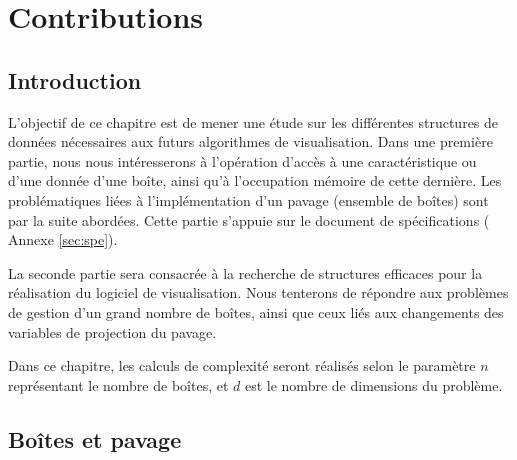 \chapter{Contributions}\label{chap:con}


\section{Introduction}%

L'objectif de ce chapitre est de mener une étude sur les différentes structures de données nécessaires aux futurs algorithmes de visualisation. Dans une première partie, nous nous intéresserons à l'opération d'accès à une caractéristique ou d'une donnée d'une boîte, ainsi qu'à l'occupation mémoire de cette dernière. Les problématiques liées à l'implémentation d'un pavage (ensemble de boîtes) sont par la suite abordées. Cette partie s'appuie sur le document de spécifications (\cf{}  Annexe \ref{sec:spe}).


La seconde partie sera consacrée à la recherche de structures efficaces pour la réalisation du logiciel de visualisation. Nous tenterons de répondre aux problèmes de gestion d'un grand nombre de boîtes, ainsi que ceux liés aux changements des variables de projection du pavage.

 Dans ce chapitre, les calculs de complexité seront réalisés selon le paramètre $n$  représentant le nombre de boîtes, et $d$ est le nombre de dimensions du problème.



\section{Boîtes et pavage}

